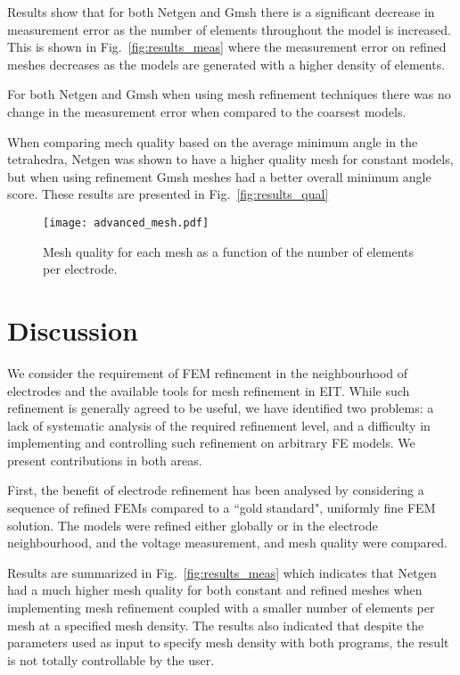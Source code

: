 \documentclass[12pt]{iopart}
\begin{document}
  Results show that for both Netgen and Gmsh there is a significant decrease in measurement error 
  as the number of elements throughout the model is increased. This is shown in Fig.~\ref{fig:results_meas} 
  where the measurement error on refined meshes decreases as the models are generated with a higher 
  density of elements. 
  
  For both Netgen and Gmsh when using mesh refinement techniques there was no change in the measurement error when compared to 
  the coarsest models. %
  
  When comparing mech quality based on the average minimum angle in the tetrahedra, Netgen was shown to have a higher 
  quality mesh for constant models, but when using refinement Gmsh meshes had a better overall minimum angle score. 
  These results are presented in Fig.~\ref{fig:results_qual} 
  
   \begin{figure}
    \texttt{[image: advanced\_mesh.pdf]}
    \caption{\label{fig:results_original_} Mesh quality for each mesh as a function of the number of elements per electrode.}
  \end{figure}
  
  
  
\section{Discussion}
We consider the requirement of FEM refinement in the neighbourhood of
electrodes and the available tools for mesh refinement in EIT. 
While such refinement is generally agreed to be useful,
we have identified two problems: a lack of systematic analysis of
the required refinement level, and a difficulty in implementing and controlling such
refinement on arbitrary FE models. We present contributions in
both areas.

First, the benefit of electrode refinement has been analysed by considering
a sequence of refined FEMs compared to a ``gold standard", uniformly fine
FEM solution. The models were refined either globally or in the electrode
neighbourhood, and the voltage measurement,  and mesh quality %
were compared.

Results are summarized in Fig.~\ref{fig:results_meas} which indicates
that Netgen had a much higher mesh quality for both constant and refined meshes 
when implementing mesh refinement 
coupled with a smaller number of elements per mesh at a specified 
mesh density. 
The results also indicated that despite the parameters used as input 
to specify mesh density with both programs, the result is not totally
controllable by the user. 
\end{document}

